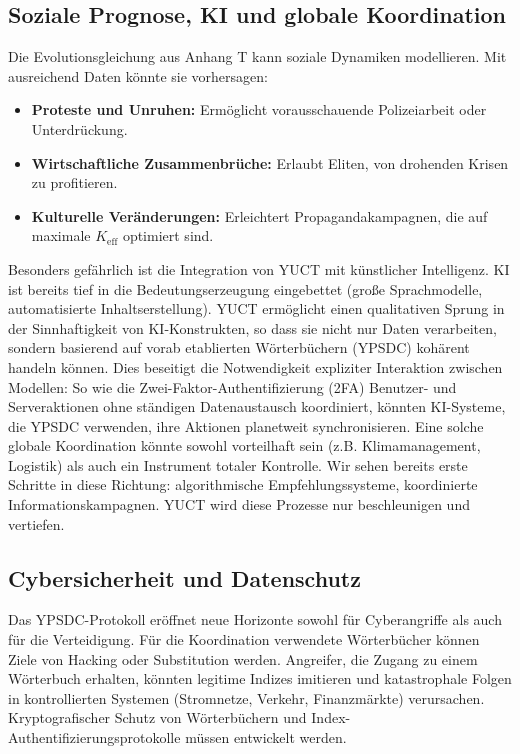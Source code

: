 \documentclass[12pt,a4paper]{article}
\theoremstyle{remark}
\newcommand{\Keff}{K_{\mathrm{eff}}}
\begin{document}
	\subsection{Soziale Prognose, KI und globale Koordination}
	\label{subsec:social}
	
	Die Evolutionsgleichung aus Anhang T kann soziale Dynamiken modellieren. Mit ausreichend Daten könnte sie vorhersagen:
	\begin{itemize}[leftmargin=*]
		\item \textbf{Proteste und Unruhen:} Ermöglicht vorausschauende Polizeiarbeit oder Unterdrückung.
		\item \textbf{Wirtschaftliche Zusammenbrüche:} Erlaubt Eliten, von drohenden Krisen zu profitieren.
		\item \textbf{Kulturelle Veränderungen:} Erleichtert Propagandakampagnen, die auf maximale \(\Keff\) optimiert sind.
	\end{itemize}
	
	Besonders gefährlich ist die Integration von YUCT mit künstlicher Intelligenz. KI ist bereits tief in die Bedeutungserzeugung eingebettet (große Sprachmodelle, automatisierte Inhaltserstellung). YUCT ermöglicht einen qualitativen Sprung in der Sinnhaftigkeit von KI-Konstrukten, so dass sie nicht nur Daten verarbeiten, sondern basierend auf vorab etablierten Wörterbüchern (YPSDC) kohärent handeln können. Dies beseitigt die Notwendigkeit expliziter Interaktion zwischen Modellen: So wie die Zwei-Faktor-Authentifizierung (2FA) Benutzer- und Serveraktionen ohne ständigen Datenaustausch koordiniert, könnten KI-Systeme, die YPSDC verwenden, ihre Aktionen planetweit synchronisieren. Eine solche globale Koordination könnte sowohl vorteilhaft sein (z.B. Klimamanagement, Logistik) als auch ein Instrument totaler Kontrolle. Wir sehen bereits erste Schritte in diese Richtung: algorithmische Empfehlungssysteme, koordinierte Informationskampagnen. YUCT wird diese Prozesse nur beschleunigen und vertiefen.
	
	\subsection{Cybersicherheit und Datenschutz}
	\label{subsec:cyber}
	
	Das YPSDC-Protokoll eröffnet neue Horizonte sowohl für Cyberangriffe als auch für die Verteidigung. Für die Koordination verwendete Wörterbücher können Ziele von Hacking oder Substitution werden. Angreifer, die Zugang zu einem Wörterbuch erhalten, könnten legitime Indizes imitieren und katastrophale Folgen in kontrollierten Systemen (Stromnetze, Verkehr, Finanzmärkte) verursachen. Kryptografischer Schutz von Wörterbüchern und Index-Authentifizierungsprotokolle müssen entwickelt werden.
	
\end{document}
